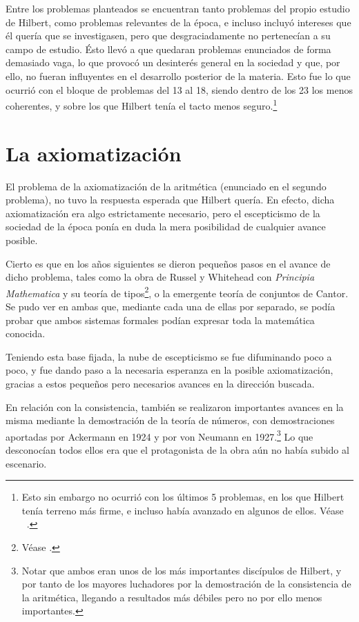 Entre los problemas planteados se encuentran tanto problemas del propio estudio de Hilbert, como problemas relevantes de la época, e incluso incluyó intereses que él quería que se
investigasen, pero que desgraciadamente no pertenecían a su campo de estudio. Ésto llevó a que quedaran problemas enunciados de forma demasiado vaga, lo que provocó un desinterés 
general en la sociedad y que, por ello, no fueran influyentes en el desarrollo posterior de la materia. Esto fue lo que ocurrió con el bloque de problemas del 13 al 18, siendo dentro
de los 23 los menos coherentes, y sobre los que Hilbert tenía el tacto menos seguro.\footnote{Esto sin embargo no ocurrió con los últimos 5 problemas, en los que Hilbert tenía terreno
más firme, e incluso había avanzado en algunos de ellos. Véase ~\cite[Pág. 85]{BREZIS199876}.}  


\section{La axiomatización}

El problema de la axiomatización de la aritmética (enunciado en el segundo problema), no tuvo la respuesta esperada que Hilbert quería. En efecto, dicha axiomatización
era algo estrictamente necesario, pero el escepticismo de la sociedad de la época ponía en duda la mera posibilidad de cualquier avance posible.

Cierto es que en los años siguientes se dieron pequeños pasos en el avance de dicho problema, tales como la obra de Russel y Whitehead con \textit{Principia Mathematica}
y su teoría de tipos\footnote{Véase \cite{an1910principia}.}, o la emergente teoría de conjuntos de Cantor. Se pudo ver en ambas que, mediante cada una de ellas por separado, se podía probar 
que ambos sistemas formales podían expresar toda la matemática conocida.

Teniendo esta base fijada, la nube de escepticismo se fue difuminando poco a poco, y fue dando paso a la necesaria esperanza en la posible axiomatización, gracias a estos 
pequeños pero necesarios avances en la dirección buscada. 

En relación con la consistencia, también se realizaron importantes avances en la misma mediante la demostración de la teoría de números, con demostraciones aportadas por Ackermann en 1924 y por 
von Neumann en 1927.\footnote{Notar que ambos eran unos de los más importantes discípulos de Hilbert, y por tanto de los mayores luchadores por la demostración de la consistencia de la aritmética, 
llegando a resultados más débiles pero no por ello menos importantes.} Lo que desconocían todos ellos era que el protagonista de la obra aún no había subido al escenario.


